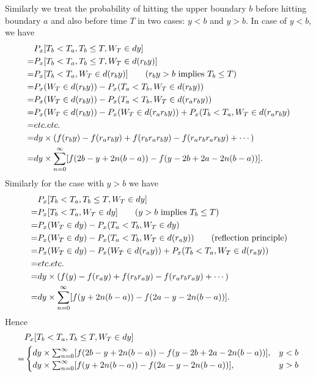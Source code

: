 Similarly we treat the probability of hitting the upper boundary $b$ before 
hitting boundary $a$ and also before time $T$ in two cases: $y<b$ and $y>b$.
In case of $y<b$, we have
\begin{align*}
	&P_x[T_b<T_a, T_b\le T, W_T\in dy]  \notag \\
	=& P_x[T_b<T_a, T_b\le T, W_T\in d(r_b y)]  \notag \\
	=& P_x[T_b<T_a, W_T\in d(r_b y)]  \qquad \text{($r_b y>b$ implies $T_b\le T$)} 
	   \notag \\
  =& P_x(W_T\in d(r_b y)) - P_x(T_a<T_b, W_T\in d(r_b y)) \notag \\
	=& P_x(W_T\in d(r_b y)) - P_x(T_a<T_b, W_T\in d(r_a r_b y))  \notag \\
  =& P_x(W_T\in d(r_b y)) - P_x(W_T\in d(r_a r_b y))
     + P_x(T_b<T_a, W_T\in d(r_a r_b y)  \notag \\
  =& etc.etc. \notag \\
  =& dy\times (f(r_b y) - f(r_a r_b y) + f(r_b r_a r_b y) - f(r_a r_b r_a r_b y)
		 + \cdots) \\
  =& dy\times\sum_{n=0}^{\infty} [ f(2b-y+2n(b-a)) - f(y-2b+2a - 2n(b-a)) ].
\end{align*}
Similarly for the case with $y>b$ we have
\begin{align*}
	&P_x[T_b<T_a, T_b\le T, W_T\in dy]  \notag \\
	=&  P_x[T_b<T_a, W_T\in dy]   \qquad \text{($y>b$ implies $T_b\le T$)}
	    \notag \\
  =& P_x(W_T\in dy) - P_x(T_a<T_b, W_T\in dy)   \notag \\
	=& P_x(W_T\in dy) - P_x(T_a<T_b, W_T\in d(r_a y)) 
			\qquad \text{(reflection principle)}  \notag \\
	=& P_x(W_T\in dy) - P_x(W_T\in d(r_a y)) 
     + P_x(T_b<T_a, W_T\in d(r_a y))  \notag \\
	=& etc.etc.   \notag \\
  =& dy\times (f(y) - f(r_a y) + f(r_b r_a y) - f(r_a r_b r_a y)
		 + \cdots) \\
	=& dy\times\sum_{n=0}^{\infty} [ f(y+2n(b-a)) - f(2a-y-2n(b-a)) ].
\end{align*}
Hence
\begin{align}
	& P_x[T_b<T_a, T_b\le T, W_T\in dy]  \notag \\
	=& 
    \begin{cases}
			dy\times\sum_{n=0}^{\infty} [ f(2b-y+2n(b-a)) - f(y-2b+2a - 2n(b-a)) ], & y<b \\
			dy\times\sum_{n=0}^{\infty} [ f(y+2n(b-a)) - f(2a-y-2n(b-a)) ],  & y>b
    \end{cases}
\end{align}

